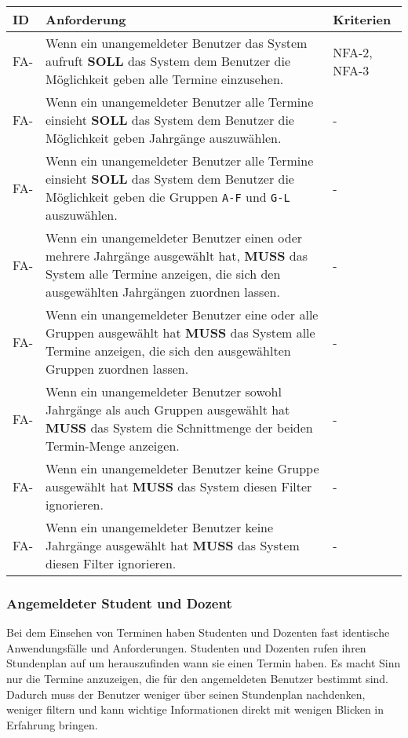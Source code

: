 \vspace{12pt}

\begin{tabular} {|p{}|p{11cm}|p{}|}
	\hline
	ID & Anforderung & Kriterien \\
	\hline
	FA-
	& Wenn ein unangemeldeter Benutzer das System aufruft \textbf{SOLL} das System dem Benutzer die Möglichkeit geben alle Termine einzusehen. 
	& NFA-2, NFA-3 \\
	\hline
	FA- 
	& Wenn ein unangemeldeter Benutzer alle Termine einsieht \textbf{SOLL} das System dem Benutzer die Möglichkeit geben Jahrgänge auszuwählen.
	& -  \\
	\hline
	FA- 
	& Wenn ein unangemeldeter Benutzer alle Termine einsieht \textbf{SOLL} das System dem Benutzer die Möglichkeit geben die Gruppen \texttt{A-F} und \texttt{G-L} auszuwählen.
	& - \\
	\hline
	FA-
	& Wenn ein unangemeldeter Benutzer einen oder mehrere Jahrgänge ausgewählt hat, \textbf{MUSS} das System alle Termine anzeigen, die sich den ausgewählten Jahrgängen zuordnen lassen.
	& - \\
	\hline
	FA-
	& Wenn ein unangemeldeter Benutzer eine oder alle Gruppen ausgewählt hat \textbf{MUSS} das System alle Termine anzeigen, die sich den ausgewählten Gruppen zuordnen lassen.
	& - \\
	\hline
	FA-
	& Wenn ein unangemeldeter Benutzer sowohl Jahrgänge als auch Gruppen ausgewählt hat \textbf{MUSS} das System die Schnittmenge der beiden Termin-Menge anzeigen.
	& - \\
	\hline
	FA-
	& Wenn ein unangemeldeter Benutzer keine Gruppe ausgewählt hat \textbf{MUSS} das System diesen Filter ignorieren.
	& - \\
	\hline
	FA-
	& Wenn ein unangemeldeter Benutzer keine Jahrgänge ausgewählt hat \textbf{MUSS} das System diesen Filter ignorieren.
	& - \\
	\hline
\end{tabular}

\newpage

\subsubsection{Angemeldeter Student und Dozent}
Bei dem Einsehen von Terminen haben Studenten und Dozenten fast identische Anwendungsfälle und Anforderungen. Studenten und Dozenten rufen ihren Stundenplan auf um herauszufinden wann sie einen Termin haben. Es macht Sinn nur die Termine anzuzeigen, die für den angemeldeten Benutzer bestimmt sind. Dadurch muss der Benutzer weniger über seinen Stundenplan nachdenken, weniger filtern und kann wichtige Informationen direkt mit wenigen Blicken in Erfahrung bringen. 

